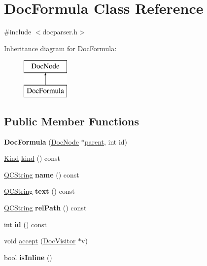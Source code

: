 \hypertarget{class_doc_formula}{}\section{Doc\+Formula Class Reference}
\label{class_doc_formula}


{\ttfamily \#include $<$docparser.\+h$>$}

Inheritance diagram for Doc\+Formula\+:\begin{figure}[H]
\begin{center}
\leavevmode
\includegraphics[height=2.000000cm]{class_doc_formula}
\end{center}
\end{figure}
\subsection*{Public Member Functions}
\begin{DoxyCompactItemize}
\item 
\mbox{\label{class_doc_formula_a381ed9f6ea1bbfbf5b247f30470417b3}} 
{\bfseries Doc\+Formula} (\mbox{\hyperlink{class_doc_node}{Doc\+Node}} $\ast$\mbox{\hyperlink{class_doc_node_a73e8ad29a91cfceb0968eb00db71a23d}{parent}}, int id)
\item 
\mbox{\hyperlink{class_doc_node_aebd16e89ca590d84cbd40543ea5faadb}{Kind}} \mbox{\hyperlink{class_doc_formula_a58d06fddf5654083666a10e02e746e78}{kind}} () const
\item 
\mbox{\label{class_doc_formula_a639835af31171584bbf72eab82d7f162}} 
\mbox{\hyperlink{class_q_c_string}{Q\+C\+String}} {\bfseries name} () const
\item 
\mbox{\label{class_doc_formula_a4744feabb05063f6019698f2b47a960c}} 
\mbox{\hyperlink{class_q_c_string}{Q\+C\+String}} {\bfseries text} () const
\item 
\mbox{\label{class_doc_formula_ae693f78dc76e8caf6060cb26fe3b58aa}} 
\mbox{\hyperlink{class_q_c_string}{Q\+C\+String}} {\bfseries rel\+Path} () const
\item 
\mbox{\label{class_doc_formula_ad34d6903f1f038579b131efa2efc2a06}} 
int {\bfseries id} () const
\item 
void \mbox{\hyperlink{class_doc_formula_a714e301b3a0805e3f117e42d3953b881}{accept}} (\mbox{\hyperlink{class_doc_visitor}{Doc\+Visitor}} $\ast$v)
\item 
\mbox{\label{class_doc_formula_a3ffb67844f3342f7f7ca97ad1b885cfb}} 
bool {\bfseries is\+Inline} ()
\end{DoxyCompactItemize}
